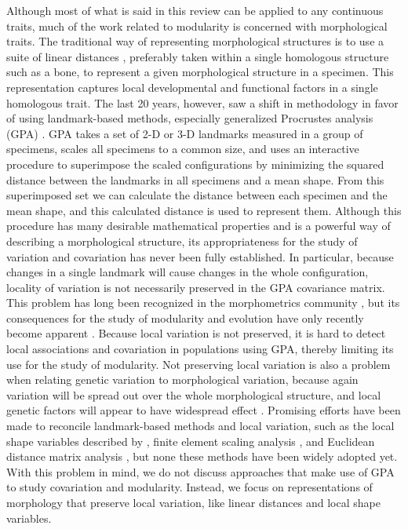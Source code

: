 \begin{refsection}
Although most of what is said in this review can be applied to any
continuous traits, much of the work related to modularity is concerned
with morphological traits. The traditional way of representing
morphological structures is to use a suite of linear distances
\parencite{Olson1958-qk}, preferably
taken within a single homologous structure such as a bone, to represent
a given morphological structure in a specimen. This representation
captures local developmental and functional factors in a single
homologous trait. The last 20 years, however, saw a shift in methodology
in favor of using landmark-based methods, especially generalized
Procrustes analysis (GPA) \parencite{Kendall1984-do, Bookstein1997-cp}. 
GPA takes a set of 2-D or 3-D landmarks
measured in a group of specimens, scales all specimens to a common size,
and uses an interactive procedure to superimpose the scaled
configurations by minimizing the squared distance between the landmarks
in all specimens and a mean shape. From this superimposed set we can
calculate the distance between each specimen and the mean shape, and
this calculated distance is used to represent them. Although this
procedure has many desirable mathematical properties \parencite{Bookstein1997-cp}
 and is a powerful way
of describing a morphological structure, its appropriateness for the
study of variation and covariation has never been fully established. In
particular, because changes in a single landmark will cause changes in
the whole configuration, locality of variation is not necessarily
preserved in the GPA covariance matrix. This problem has long been
recognized in the morphometrics community \parencite{Adams2013-qe}, but its
consequences for the study of modularity and evolution have only
recently become apparent \parencite{Marquez2012-qe, Van_der_Linde2009-yx}.
Because local variation is not preserved, it is hard to detect local
associations and covariation in populations using GPA, thereby limiting
its use for the study of modularity. Not preserving local variation is
also a problem when relating genetic variation to morphological
variation, because again variation will be spread out over the whole
morphological structure, and local genetic factors will appear to have
widespread effect \parencite{Berner2011-bi}. Promising efforts have been made to reconcile landmark-based
methods and local variation, such as the local shape variables described
by \textcite{Marquez2012-qe}, finite
element scaling analysis \parencite{Cheverud1986-ib}, and Euclidean distance matrix analysis
\parencite{Lele1991-lk}, but none these
methods have been widely adopted yet. With this problem in mind, we
do not discuss approaches that make use of GPA to study covariation and
modularity. Instead, we focus on representations of morphology that
preserve local variation, like linear distances and local shape
variables.


\end{refsection}
